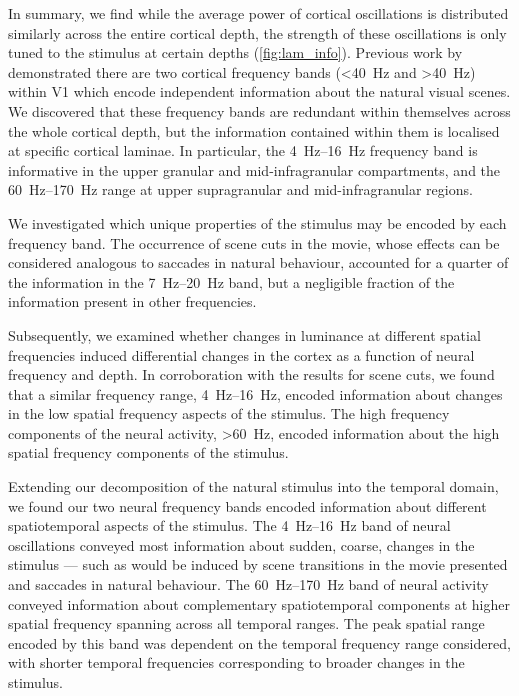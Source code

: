In summary, we find while the average power of cortical oscillations is distributed similarly across the entire cortical depth, the strength of these oscillations is only tuned to the stimulus at certain depths (\autoref{fig:lam_info}).
Previous work by \citet{Belitski2008} demonstrated there are two cortical frequency bands (\SI{<40}{Hz} and \SI{>40}{Hz}) within \ac{V1} which encode independent information about the natural visual scenes.
We discovered that these frequency bands are redundant within themselves across the whole cortical depth, but the information contained within them is localised at specific cortical laminae.
In particular, the \SIrange{4}{16}{Hz} frequency band is informative in the upper granular and mid-infragranular compartments, and the \SIrange{60}{170}{Hz} range at upper supragranular and mid-infragranular regions.

We investigated which unique properties of the stimulus may be encoded by each frequency band.
The occurrence of scene cuts in the movie, whose effects can be considered analogous to saccades in natural behaviour, accounted for a quarter of the information in the \SIrange{7}{20}{Hz} band, but a negligible fraction of the information present in other frequencies.

Subsequently, we examined whether changes in luminance at different spatial frequencies induced differential changes in the cortex as a function of neural frequency and depth.
In corroboration with the results for scene cuts, we found that a similar frequency range, \SIrange{4}{16}{Hz}, encoded information about changes in the low spatial frequency aspects of the stimulus.
The high frequency components of the neural activity, \SI{>60}{Hz}, encoded information about the high spatial frequency components of the stimulus.

Extending our decomposition of the natural stimulus into the temporal domain, we found our two neural frequency bands encoded information about different spatiotemporal aspects of the stimulus.
The \SIrange{4}{16}{Hz} band of neural oscillations conveyed most information about sudden, coarse, changes in the stimulus --- such as would be induced by scene transitions in the movie presented and saccades in natural behaviour.
The \SIrange{60}{170}{Hz} band of neural activity conveyed information about complementary spatiotemporal components at higher spatial frequency spanning across all temporal ranges.
The peak spatial range encoded by this band was dependent on the temporal frequency range considered, with shorter temporal frequencies corresponding to broader changes in the stimulus.

